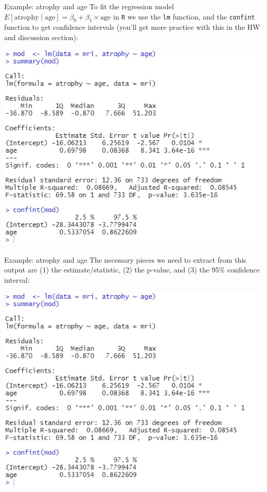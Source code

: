 \documentclass[10pt,t]{beamer}
\begin{document}
\begin{frame}{Example: atrophy and age}
To fit the regression model $E[\text{atrophy} \mid \text{age}] = \beta_0 + \beta_1 \times \text{age}$ in \texttt{R} we use the \texttt{lm} function, and the \texttt{confint} function to get confidence intervals (you'll get more practice with this in the HW and discussion section):

\vspace{0.15cm}

\centering \includegraphics[scale=0.45]{figures/atrophy_age_code}

\end{frame}

\begin{frame}{Example: atrophy and age}
The necessary pieces we need to extract from this output are (1) the estimate/statistic, (2) the p-value, and (3) the 95\% confidence interval:

\vspace{0.15cm}

\centering \includegraphics[scale=0.45]{figures/atrophy_age_code}

\end{frame}
\end{document}
